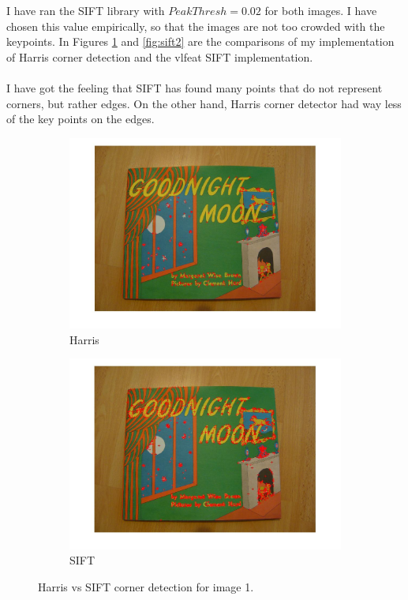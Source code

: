 \documentclass[paper=a4, fontsize=11pt]{scrartcl} %
\numberwithin{equation}{section} %
\numberwithin{figure}{section} %
\numberwithin{table}{section} %
\begin{document}
I have ran the SIFT library with $PeakThresh = 0.02$ for both images. I have chosen this value empirically, so that the images are not too crowded with the keypoints. In Figures \ref{fig:sift1} and \ref{fig:sift2} are the comparisons of my implementation of Harris corner detection and the vlfeat SIFT implementation. \\
\\
I have got the feeling that SIFT has found many points that do not represent corners, but rather edges. On the other hand, Harris corner detector had way less of the key points on the edges.

\begin{figure}
\centering
\begin{subfigure}{.5\textwidth}
  \centering
  \includegraphics[width=1\linewidth]{im1_harris_corners.jpg}
  \caption{Harris}
\end{subfigure}%
\begin{subfigure}{.5\textwidth}
  \centering
  \includegraphics[width=1\linewidth]{img1_sift_corners.jpg}
  \caption{SIFT}
\end{subfigure}
\caption{Harris vs SIFT corner detection for image 1.}
\label{fig:sift1}
\end{figure}
\end{document}
